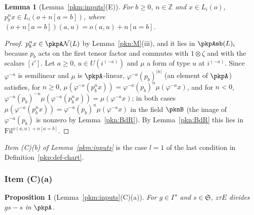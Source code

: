 \documentclass[10pt]{amsart}
\newtheorem{proposition}[theorem]{Proposition}
\newtheorem{lemma}[theorem]{Lemma}
\theoremstyle{definition}
\theoremstyle{remark}
\newcommand{\Z}{\mathbb Z}
\begin{document}
\begin{lemma}[Lemma~\ref{pkm:inputs}(E)]\label{pkn:E}
For $b\ge0$, $n\in\Z$ and $x\in L_i(o)$, $p_b^nx\in L_i(o+n[a=b])$, where $(o+n[a=b])(a,u)=
o(a,u)+n[a=b]$.
\end{lemma}

\begin{proof}
$p_b^nx\in\pkpA\mathcal N(L)$ by Lemma~\ref{pkn:M}(iii), and it lies in $\pkpAmb(L)_i$ because $p_b$ acts
on the first tensor factor and commutes with $1\otimes\zeta$ and with the scalars $[i']$. Let $a\ge0$,
$u\in U(i^{(-a)})$ and $\mu$ a form of type $u$ at $i^{(-a)}$. Since $\varphi^{-a}$ is semilinear and
$\mu$ is $\pkpA$-linear, $\varphi^{-a}(p_b)^{|n|}$ (an element of $\pkpA$) satisfies, for $n\ge0$,
$\mu(\varphi^{-a}(p_b^nx))=\varphi^{-a}(p_b)^n\mu(\varphi^{-a}x)$, and for $n<0$,
$\varphi^{-a}(p_b)^{-n}\mu(\varphi^{-a}(p_b^nx))=\mu(\varphi^{-a}x)$; in both cases
$\mu(\varphi^{-a}(p_b^nx))=\varphi^{-a}(p_b)^n\mu(\varphi^{-a}x)$ in the field $\pknB$ (the image of
$\varphi^{-a}(p_b)$ is nonzero by Lemma~\ref{pkn:BdR}). By Lemma~\ref{pkn:BdR} this lies in
$\mathrm{Fil}^{o(a,u)+n[a=b]}$.
\end{proof}

\emph{Item (C)(b) of Lemma~\ref{pkm:inputs}} is the case $l=1$ of the last condition in
Definition~\ref{pkp:def-chart}.

\subsubsection{Item (C)(a)}\label{pkn:ss-Ca}

\begin{proposition}[Lemma~\ref{pkm:inputs}(C)(a)]\label{pkn:Ca}
For $g\in\Gamma'$ and $s\in\mathfrak S$, $z\tau E$ divides $gs-s$ in $\pkpA$.
\end{proposition}
\end{document}
